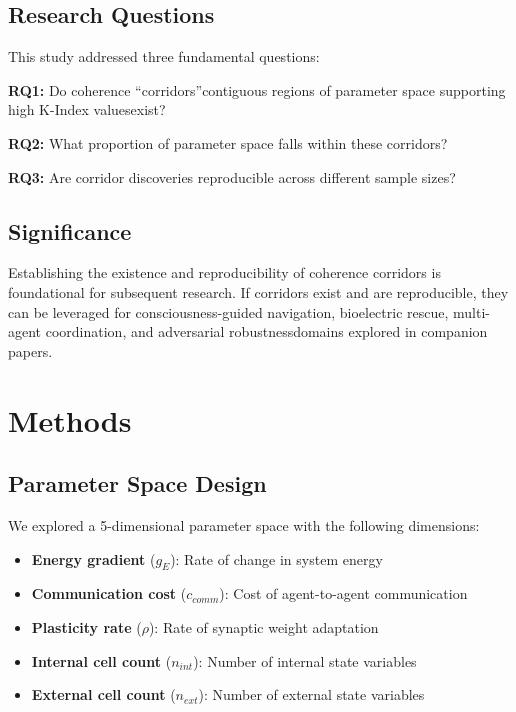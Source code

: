 \documentclass[10pt,letterpaper]{article}
\begin{document}
\subsection*{Research Questions}

This study addressed three fundamental questions:

\textbf{RQ1:} Do coherence ``corridors''\textemdash{}contiguous regions of parameter space supporting high K-Index values\textemdash{}exist?

\textbf{RQ2:} What proportion of parameter space falls within these corridors?

\textbf{RQ3:} Are corridor discoveries reproducible across different sample sizes?

\subsection*{Significance}

Establishing the existence and reproducibility of coherence corridors is foundational for subsequent research. If corridors exist and are reproducible, they can be leveraged for consciousness-guided navigation, bioelectric rescue, multi-agent coordination, and adversarial robustness\textemdash{}domains explored in companion papers.

\section*{Methods}

\subsection*{Parameter Space Design}

We explored a 5-dimensional parameter space with the following dimensions:

\begin{itemize}
    \item \textbf{Energy gradient} ($g_E$): Rate of change in system energy
    \item \textbf{Communication cost} ($c_{comm}$): Cost of agent-to-agent communication
    \item \textbf{Plasticity rate} ($\rho$): Rate of synaptic weight adaptation
    \item \textbf{Internal cell count} ($n_{int}$): Number of internal state variables
    \item \textbf{External cell count} ($n_{ext}$): Number of external state variables
\end{itemize}
\end{document}
